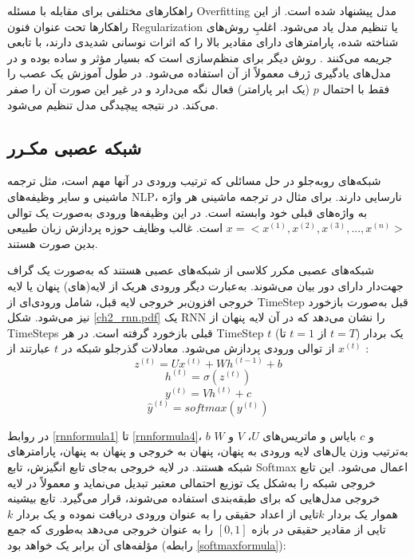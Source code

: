 راهکارهای مختلفی برای مقابله با مسئله \gls{Overfitting} مدل پیشنهاد شده است. از این راهکارها تحت عنوان فنون \gls{Regularization} یا تنظیم مدل یاد می‌شود. اغلبِ روش‌‌های شناخته شده، پارامترهای دارای مقادیر بالا را که اثرات نوسانی شدیدی دارند، با تابعی جریمه می‌کنند \cite{Karpathy2016}. روش دیگر برای منظم‌سازی 
 \cite{JMLR:v15:srivastava14a}
است که بسیار مؤثر و ساده بوده و در مدل‌های یادگیری ژرف معمولاً از آن استفاده می‌شود. در طول آموزش  یک عصب را فقط با احتمال $p$ (یک ابر پارامتر) فعال نگه می‌دارد و در غیر این صورت آن را صفر می‌کند. در نتیجه پیچیدگی مدل تنظیم می‌شود.



 
 \subsection{شبکه عصبی مکـرر}
شبکه‌‌های روبه‌جلو در حل مسائلی که ترتیب ورودی در آنها مهم است، مثل ترجمه ماشینی و سایر وظیفه‌های \gls{NLP}، نارسایی دارند. برای مثال در ترجمه ماشینی هر واژه به واژه‌های قبلی خود وابسته است. در این وظیفه‌ها ورودی به‌صورت یک توالی 
$ x = <x^{(1)}, x^{(2)}, x^{(3)}, ..., x^{(n)}> $
است. غالب وظایف حوزه پردازش زبان طبیعی بدین صورت هستند.


شبکه‌های عصبی مکرر
کلاسی از شبکه‌‌های عصبی هستند که به‌صورت یک گراف جهت‌دار دارای دور بیان می‌شوند. به‌عبارت دیگر ورودی هریک از لایه(های) پنهان یا لایه خروجی افزون‌بر خروجی لایه قبل، شامل ورودی‌ای از \gls{TimeStep} قبل به‌صورت بازخورد نیز می‌شود. ‏شکل \ref{ch2_rnn.pdf} یک \gls{RNN} را نشان می‌دهد که در آن لایه پنهان از \glspl{TimeStep} قبلی بازخورد گرفته است. در هر \gls{TimeStep} 
$ t $
 (از
 $ t=1 $ 
 تا 
 $ t=T $)
 یک بردار 
 $ x^{(t)} $
 از توالی ورودی پردازش می‌شود. معادلات گذرجلو شبکه در $ t $ عبارتند از \cite{Goodfellow-et-al-2016}:
 \begin{equation}\label{rnnformula1}
 z^{(t)}=Ux^{(t)}+Wh^{(t-1)}+b
 \end{equation}
 \begin{equation}\label{rnnformula2}
 h^{(t)}=\sigma(z^{(t)})
 \end{equation}
  \begin{equation}\label{rnnformula3}
 y^{(t)} = Vh^{(t)}+c
 \end{equation}
 \begin{equation}\label{rnnformula4}
 \hat{y}^{(t)}=softmax(y^{(t)})
 \end{equation}
 
 
 
 در روابط \ref{rnnformula1} تا \ref{rnnformula4}، $ b $ و $ c $ بایاس و ماتریس‌های  $ U $، $ V $ و $ W $ به‌ترتیب وزن یال‌‌های لایه ورودی به پنهان، پنهان به خروجی و پنهان به پنهان، پارامترهای شبکه هستند. در لایه خروجی به‌جای تابع انگیزش، تابع \gls{Softmax} اعمال می‌شود. این تابع خروجی شبکه را به‌شکل یک توزیع احتمالی معتبر تبدیل می‌نماید و معمولاً در لایه خروجی مدل‌هایی که برای طبقه‌بندی استفاده می‌شوند، قرار می‌گیرد. تابع بیشینه هموار یک بردار $k$تایی از اعداد حقیقی را به عنوان ورودی دریافت نموده و یک بردار $k$تایی از مقادیر حقیقی در بازه  $ [0,1] $ را به عنوان خروجی می‌دهد به‌طوری که جمع مؤلفه‌‌های آن برابر یک خواهد بود (رابطه \ref{softmaxformula}):
 
